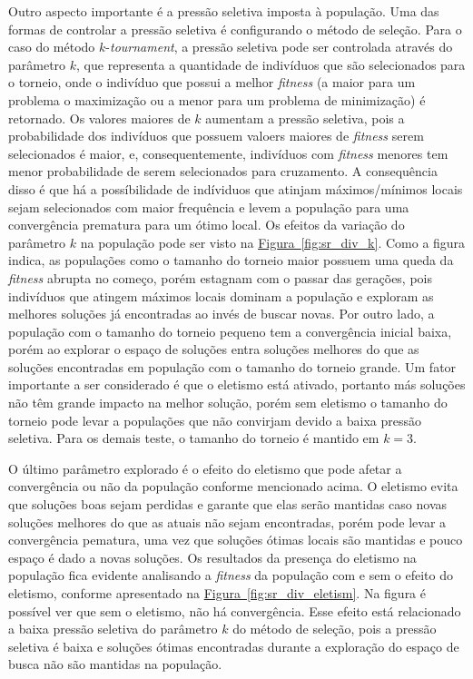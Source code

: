 \documentclass[a4paper]{article}
\begin{document}
Outro aspecto importante é a pressão seletiva imposta à população. Uma das
formas de controlar a pressão seletiva é configurando o método de seleção. Para
o caso do método $k$-\textit{tournament}, a pressão seletiva pode ser controlada
através do parâmetro $k$, que representa a quantidade de indivíduos que são
selecionados para o torneio, onde o indivíduo que possui a melhor
\textit{fitness} (a maior para um problema o maximização ou a menor para um
problema de minimização) é retornado. Os valores maiores de $k$ aumentam a
pressão seletiva, pois a probabilidade dos indivíduos que possuem valoers
maiores de \textit{fitness} serem selecionados é maior, e, consequentemente,
indivíduos com \textit{fitness} menores tem menor probabilidade de serem
selecionados para cruzamento. A consequência disso é que há a possíbilidade de
indíviduos que atinjam máximos/mínimos locais sejam selecionados com maior
frequência e levem a população para uma convergência prematura para um ótimo
local. Os efeitos da variação do parâmetro $k$ na população pode ser visto na
\hyperref[fig:sr_div_k]{Figura~\ref*{fig:sr_div_k}}. Como a figura indica, as
populações como o tamanho do torneio maior possuem uma queda da \textit{fitness}
abrupta no começo, porém estagnam com o passar das gerações, pois indivíduos que
atingem máximos locais dominam a população e exploram as melhores soluções já
encontradas ao invés de buscar novas. Por outro lado, a população com o tamanho
do torneio pequeno tem a convergência inicial baixa, porém ao explorar o espaço
de soluções entra soluções melhores do que as soluções encontradas em população
com o tamanho do torneio grande. Um fator importante a ser considerado é que o
eletismo está ativado, portanto más soluções não têm grande impacto na melhor
solução, porém sem eletismo o tamanho do torneio pode levar a populações que não
convirjam devido a baixa pressão seletiva. Para os demais teste, o tamanho do
torneio é mantido em $k=3$.

O último parâmetro explorado é o efeito do eletismo que pode afetar a
convergência ou não da população conforme mencionado acima. O eletismo evita que
soluções boas sejam perdidas e garante que elas serão mantidas caso novas
soluções melhores do que as atuais não sejam encontradas, porém pode levar a
convergência pematura, uma vez que soluções ótimas locais são mantidas e pouco
espaço é dado a novas soluções. Os resultados da presença do eletismo na
população fica evidente analisando a \textit{fitness} da população com e sem o
efeito do eletismo, conforme apresentado na
\hyperref[fig:sr_div_eletism]{Figura~\ref*{fig:sr_div_eletism}}. Na figura é
possível ver que sem o eletismo, não há convergência. Esse efeito está
relacionado a baixa pressão seletiva do parâmetro $k$ do método de seleção, pois
a pressão seletiva é baixa e soluções ótimas encontradas durante a exploração do
espaço de busca não são mantidas na população.
\end{document}
